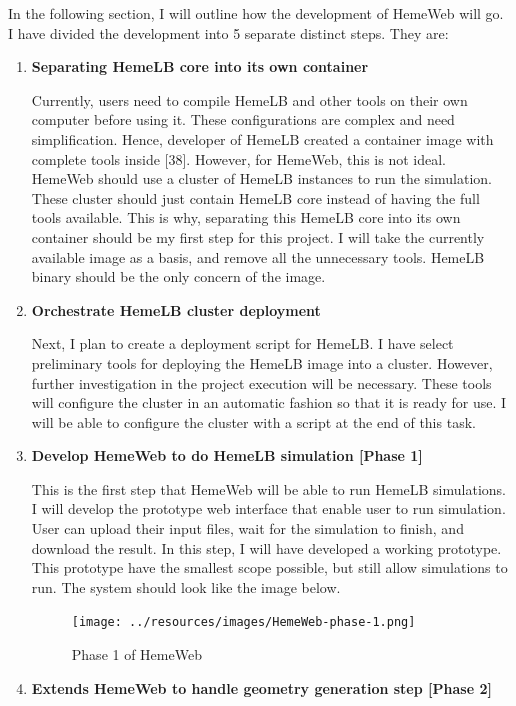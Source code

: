 \documentclass[]{article}
\begin{document}
In the following section, I will outline how the development of HemeWeb
will go. I have divided the development into 5 separate distinct steps.
They are:

\begin{enumerate}
\def\labelenumi{\arabic{enumi}.}
\item
  \textbf{Separating HemeLB core into its own container}

  Currently, users need to compile HemeLB and other tools on their own
  computer before using it. These configurations are complex and need
  simplification. Hence, developer of HemeLB created a container image
  with complete tools inside {[}38{]}. However, for HemeWeb, this is not
  ideal. HemeWeb should use a cluster of HemeLB instances to run the
  simulation. These cluster should just contain HemeLB core instead of
  having the full tools available. This is why, separating this HemeLB
  core into its own container should be my first step for this project.
  I will take the currently available image as a basis, and remove all
  the unnecessary tools. HemeLB binary should be the only concern of the
  image.
\item
  \textbf{Orchestrate HemeLB cluster deployment}

  Next, I plan to create a deployment script for HemeLB. I have select
  preliminary tools for deploying the HemeLB image into a cluster.
  However, further investigation in the project execution will be
  necessary. These tools will configure the cluster in an automatic
  fashion so that it is ready for use. I will be able to configure the
  cluster with a script at the end of this task.
\item
  \textbf{Develop HemeWeb to do HemeLB simulation {[}Phase 1{]}}

  This is the first step that HemeWeb will be able to run HemeLB
  simulations. I will develop the prototype web interface that enable
  user to run simulation. User can upload their input files, wait for
  the simulation to finish, and download the result. In this step, I
  will have developed a working prototype. This prototype have the
  smallest scope possible, but still allow simulations to run. The
  system should look like the image below.

  \begin{figure}[H]
  \centering
  \texttt{[image: ../resources/images/HemeWeb-phase-1.png]}
  \caption{Phase 1 of HemeWeb}
  \end{figure}
\item
  \textbf{Extends HemeWeb to handle geometry generation step {[}Phase
  2{]}}


\end{enumerate}
\end{document}

